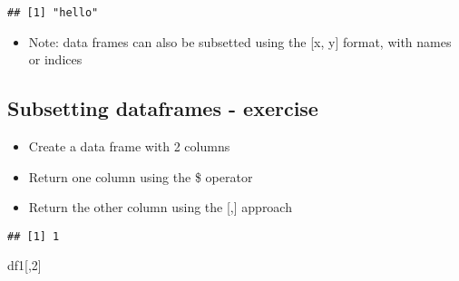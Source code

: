 \documentclass[]{article}
\newenvironment{Shaded}{\begin{snugshade}}{\end{snugshade}}
\newcommand{\KeywordTok}[1]{\textcolor[rgb]{0.13,0.29,0.53}{\textbf{#1}}}
\newcommand{\DataTypeTok}[1]{\textcolor[rgb]{0.13,0.29,0.53}{#1}}
\newcommand{\DecValTok}[1]{\textcolor[rgb]{0.00,0.00,0.81}{#1}}
\newcommand{\StringTok}[1]{\textcolor[rgb]{0.31,0.60,0.02}{#1}}
\newcommand{\OtherTok}[1]{\textcolor[rgb]{0.56,0.35,0.01}{#1}}
\newcommand{\OperatorTok}[1]{\textcolor[rgb]{0.81,0.36,0.00}{\textbf{#1}}}
\newcommand{\NormalTok}[1]{#1}
\providecommand{\tightlist}{%
  \setlength{\itemsep}{0pt}\setlength{\parskip}{0pt}}
\begin{document}
\begin{Shaded}
\end{Shaded}

\begin{verbatim}
## [1] "hello"
\end{verbatim}

\begin{itemize}
\tightlist
\item
  Note: data frames can also be subsetted using the {[}x, y{]} format,
  with names or indices
\end{itemize}

\subsection{Subsetting dataframes -
exercise}\label{subsetting-dataframes---exercise}

\begin{itemize}
\tightlist
\item
  Create a data frame with 2 columns
\item
  Return one column using the \$ operator
\item
  Return the other column using the {[},{]} approach
\end{itemize}

\begin{Shaded}
\end{Shaded}

\begin{verbatim}
## [1] 1
\end{verbatim}

\begin{Shaded}
\begin{Highlighting}[]
\NormalTok{df1[,}\DecValTok{2}\NormalTok{]}
\end{Highlighting}
\end{Shaded}
\end{document}

